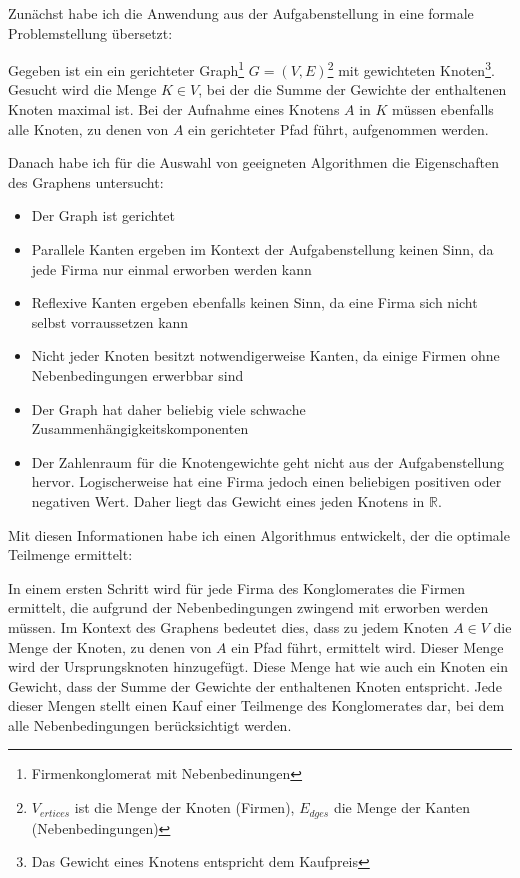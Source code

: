Zunächst habe ich die Anwendung aus der Aufgabenstellung in eine formale Problemstellung übersetzt:
\begin{displayquote}
	Gegeben ist ein ein gerichteter Graph\footnote{Firmenkonglomerat mit Nebenbedinungen} \(G=(V,E)\)\footnote{\(V_{ertices}\) ist die Menge der Knoten (Firmen), \(E_{dges}\) die Menge der Kanten (Nebenbedingungen)} mit gewichteten Knoten\footnote{Das Gewicht eines Knotens entspricht dem Kaufpreis}. Gesucht wird die Menge \(K \in V\), bei der die Summe der Gewichte der enthaltenen Knoten maximal ist. Bei der Aufnahme eines Knotens  \(A\) in \(K\) müssen ebenfalls alle Knoten, zu denen von \(A\) ein gerichteter Pfad führt, aufgenommen werden.
\end{displayquote}

Danach habe ich für die Auswahl von geeigneten Algorithmen die Eigenschaften des Graphens untersucht:
\begin{itemize}
	\item Der Graph ist gerichtet
	\item Parallele Kanten ergeben im Kontext der Aufgabenstellung keinen Sinn, da jede Firma nur einmal erworben werden kann
	\item Reflexive Kanten ergeben ebenfalls keinen Sinn, da eine Firma sich nicht selbst vorraussetzen kann
	\item Nicht jeder Knoten besitzt notwendigerweise Kanten, da einige Firmen ohne Nebenbedingungen erwerbbar sind
	\item Der Graph hat daher beliebig viele schwache Zusammenhängigkeitskomponenten
	\item Der Zahlenraum für die Knotengewichte geht nicht aus der Aufgabenstellung hervor. Logischerweise hat eine Firma jedoch einen beliebigen positiven oder negativen Wert. Daher liegt das Gewicht eines jeden Knotens in \(\mathbb{R}\).
\end{itemize}

Mit diesen Informationen habe ich einen Algorithmus entwickelt, der die optimale Teilmenge ermittelt:

In einem ersten Schritt wird für jede Firma des Konglomerates die Firmen ermittelt, die aufgrund der Nebenbedingungen zwingend mit erworben werden müssen. Im Kontext des Graphens bedeutet dies, dass zu jedem Knoten \(A \in V\) die Menge der Knoten, zu denen von \(A\) ein Pfad führt, ermittelt wird. Dieser Menge wird der Ursprungsknoten hinzugefügt. Diese Menge hat wie auch ein Knoten ein Gewicht, dass der Summe der Gewichte der enthaltenen Knoten entspricht. Jede dieser Mengen stellt einen Kauf einer Teilmenge des Konglomerates dar, bei dem alle Nebenbedingungen berücksichtigt werden.

